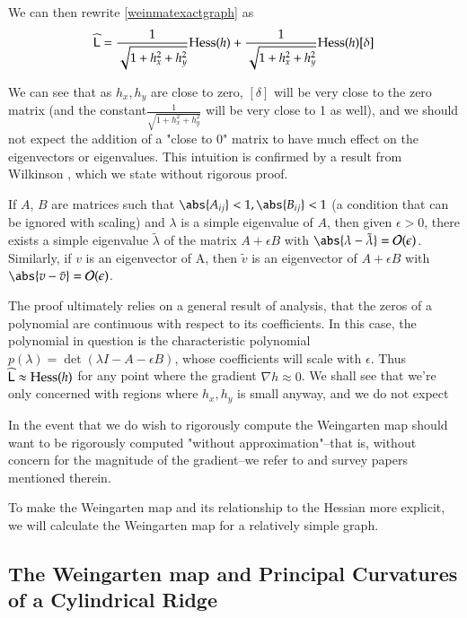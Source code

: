 We can then rewrite \cref{weinmatexactgraph} as 
\begin{equation}
\widehat{\mathsf{L}} = \frac{1}{\sqrt{1+h_x^2 + h_y^2}} \mathrm{Hess}(h)
+ \frac{1}{\sqrt{1+h_x^2 + h_y^2}} \mathrm{Hess}(h) [\delta]
\end{equation}

We can see that as $h_x, h_y$ are close to zero, $[\delta]$ will be very close to the zero matrix (and the constant$\frac{1}{\sqrt{1+h_x^2 + h_y^2}}$ will be very close to 1 as well), and we should not expect the addition of a "close to 0" matrix to have much effect on the eigenvectors or eigenvalues. This intuition is confirmed by a result from Wilkinson \cite{wilkinson-eigenvalue}, which we state without rigorous proof.

\begin{theorem}
	If $A$, $B$ are matrices such that $\abs{A_{ij}} < 1 , \abs{B_{ij}} < 1$ (a condition that can be ignored with scaling) and $\lambda$ is a simple eigenvalue of $A$, then given $\epsilon > 0$, there exists a simple eigenvalue $\tilde{\lambda}$ of the matrix $A + \epsilon B$ with $\abs{\lambda - \tilde{\lambda}} = \bigO(\epsilon)$. Similarly, if $v$ is an eigenvector of A, then $\tilde{v}$ is an eigenvector of $A + \epsilon B$ with
	$\abs{v - \tilde{v}} = \bigO(\epsilon)$.
\end{theorem}

The proof ultimately relies on a general result of analysis, that the zeros of a polynomial are continuous with respect to its coefficients. In this case, the polynomial in question is the characteristic polynomial
$p(\lambda) = \det(\lambda I - A - \epsilon B)$, whose coefficients will scale with $\epsilon$. Thus $\widehat{\mathsf{L}} \approx \mathrm{Hess}(h)$ for any point where the gradient $\nabla h \approx 0$. We shall see that we're only concerned with regions where $h_x, h_y$ is small anyway, and we do not expect 

In the event that we do wish to rigorously compute the Weingarten map should want to be rigorously computed "without approximation"--that is, without concern for the magnitude of the gradient--we refer to \cite{jiao2008consistent} and survey papers mentioned therein.

  
  To make the Weingarten map and its relationship to the Hessian more explicit, we will calculate the Weingarten map for a relatively simple graph.
  
  \subsection{The Weingarten map and Principal Curvatures of a Cylindrical Ridge} \label{sec:calculate-weinmap-of-a-ridge}
  

